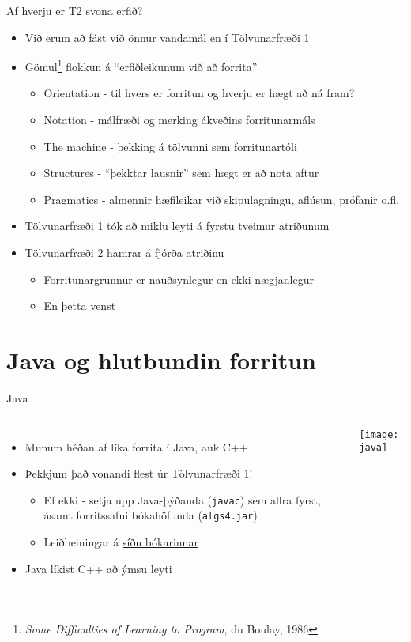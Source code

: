\documentclass{beamer}
\begin{document}
\begin{frame}{Af hverju er T2 svona erfið?}
	\begin{itemize}
		\item Við erum að fást við önnur vandamál en í Tölvunarfræði 1
		\item Gömul\footnote{\emph{Some Difficulties of Learning to Program}, du Boulay, 1986} flokkun á ``erfiðleikunum við að forrita''
		      \begin{itemize}
			      \item Orientation - til hvers er forritun og hverju er hægt að ná fram?
			      \item Notation - málfræði og merking ákveðins forritunarmáls
			      \item The machine - þekking á tölvunni sem forritunartóli
			      \item Structures - ``þekktar lausnir'' sem hægt er að nota aftur
			      \item Pragmatics - almennir hæfileikar við skipulagningu, aflúsun, prófanir o.fl.
		      \end{itemize}
		\item Tölvunarfræði 1 tók að miklu leyti á fyrstu tveimur atriðunum
		\item Tölvunarfræði 2 hamrar á fjórða atriðinu
		      \begin{itemize}
			      \item Forritunargrunnur er nauðsynlegur en ekki nægjanlegur \pause
			      \item En þetta venst
		      \end{itemize}
	\end{itemize}
\end{frame}

\section{Java og hlutbundin forritun}

\begin{frame}{Java}
	\begin{columns}
		\begin{itemize}
			\item Munum héðan af líka forrita í Java, auk C++
			\item Þekkjum það vonandi flest úr Tölvunarfræði 1!
			      \begin{itemize}
				      \item Ef ekki - setja upp Java-þýðanda (\texttt{javac}) sem allra fyrst, ásamt forritssafni bókahöfunda (\texttt{algs4.jar})
				      \item Leiðbeiningar á \href{http://algs4.cs.princeton.edu/code/}{síðu bókarinnar}
			      \end{itemize}
			\item Java líkist C++ að ýmsu leyti
		\end{itemize}
		\begin{center}
			\texttt{[image: java]}
		\end{center}
	\end{columns}
\end{frame}
\end{document}
